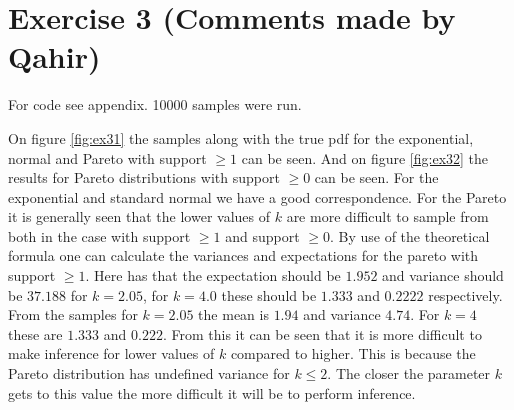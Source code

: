 \newpage
\section*{Exercise 3 (Comments made by Qahir)}
For code see appendix. 10000 samples were run. 

On figure \ref{fig:ex31} the samples along with the true pdf for the exponential, normal and Pareto with support $\geq 1$ can be seen. And on figure \ref{fig:ex32} the results for Pareto distributions with support $\geq 0$ can be seen. For the exponential and standard normal we have a good correspondence. For the Pareto it is generally seen that the lower values of $k$ are more difficult to sample from both in the case with support $\geq 1$ and support $\geq 0$. By use of the theoretical formula one can calculate the variances and expectations for the pareto with support $\geq 1$. Here has that the expectation should be $1.952$ and variance should be $37.188$ for $k=2.05$, for $k=4.0$ these should be $1.333$ and $0.2222$ respectively. From the samples for $k=2.05$ the mean is $1.94$ and variance $4.74$. For $k=4$ these are $1.333$ and $0.222$. From this it can be seen that it is more difficult to make inference for lower values of $k$ compared to higher. This is because the Pareto distribution has undefined variance for $k \leq 2$. The closer the parameter $k$ gets to this value the more difficult it will be to perform inference. 


